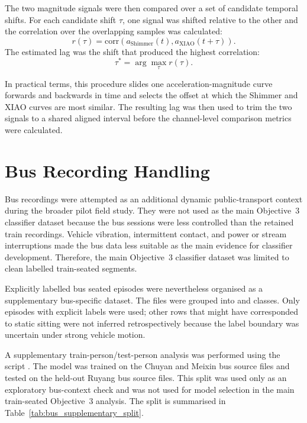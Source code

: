 The two magnitude signals were then compared over a set of candidate temporal
shifts. For each candidate shift \(\tau\), one signal was shifted relative to
the other and the correlation over the overlapping samples was calculated:
\begin{equation}
    r(\tau) =
    \mathrm{corr}\left(a_{\mathrm{Shimmer}}(t),
    a_{\mathrm{XIAO}}(t+\tau)\right).
\end{equation}
The estimated lag was the shift that produced the highest correlation:
\begin{equation}
    \tau^\ast = \arg\max_{\tau} r(\tau).
\end{equation}

In practical terms, this procedure slides one acceleration-magnitude curve
forwards and backwards in time and selects the offset at which the Shimmer and
XIAO curves are most similar. The resulting lag was then used to trim the two
signals to a shared aligned interval before the channel-level comparison
metrics were calculated.

\section{Bus Recording Handling}\label{app:bus_recording_handling}

Bus recordings were attempted as an additional dynamic public-transport
context during the broader pilot field study. They were not used as the main
Objective~3 classifier dataset because the bus sessions were less controlled
than the retained train recordings. Vehicle vibration, intermittent contact,
and power or stream interruptions made the bus data less suitable as the main
evidence for classifier development. Therefore, the main Objective~3 classifier
dataset was limited to clean labelled train-seated segments.

Explicitly labelled bus seated episodes were nevertheless organised as a
supplementary bus-specific dataset. The files were grouped into
 and  classes. Only episodes
with explicit labels were used; other rows that might have corresponded to
static sitting were not inferred retrospectively because the label boundary
was uncertain under strong vehicle motion.

A supplementary train-person/test-person analysis was performed using the
script . The model was trained on the
Chuyan and Meixin bus source files and tested on the held-out Ruyang bus source
files. This split was used only as an exploratory bus-context check and was not
used for model selection in the main train-seated Objective~3 analysis. The
split is summarised in Table~\ref{tab:bus_supplementary_split}.

